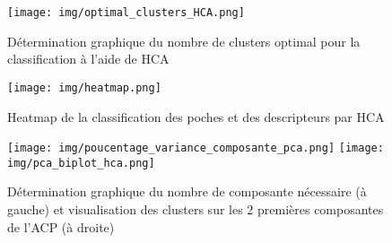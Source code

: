 \newpage
{}
\theendnotes
\newpage
{}


\nocite{*}






























\begin{minipage}{0.45\textwidth}
	\begin{figure}[H]
		\centering
		\texttt{[image: img/optimal\_clusters\_HCA.png]}
		\caption{Détermination graphique du nombre de clusters optimal pour la classification à l'aide de HCA}
		\label{fig3}
	\end{figure}
\end{minipage} 
\hfill
\begin{minipage}{0.5\textwidth}
	\begin{figure}[H]
        \centering
        \texttt{[image: img/heatmap.png]}
        \caption{Heatmap de la classification des poches et des descripteurs par HCA}
        \label{fig4}
    \end{figure}
\end{minipage}

\begin{figure}[H]
    \centering
    \texttt{[image: img/poucentage\_variance\_composante\_pca.png]}
    \texttt{[image: img/pca\_biplot\_hca.png]}
    \caption{Détermination graphique du nombre de composante nécessaire (à gauche) et visualisation des clusters sur les 2 premières composantes de l'ACP (à droite)}
    \label{fig5}
\end{figure}